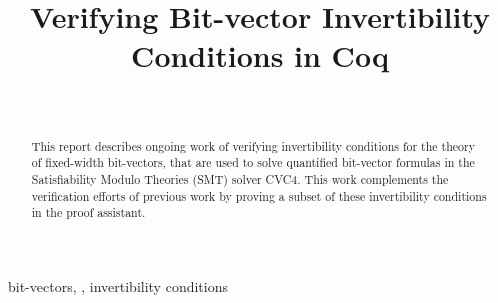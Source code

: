\documentclass[10pt,conference]{IEEEtran}
\begin{document}
\title{Verifying Bit-vector Invertibility Conditions in Coq}


\author{
\\
}

\maketitle



\begin{abstract}
This report describes ongoing work of verifying invertibility 
conditions for the theory of fixed-width bit-vectors, 
that are used 
to solve quantified bit-vector formulas in the 
Satisfiability Modulo Theories (SMT) solver CVC4. 
This work complements the verification 
efforts of previous work by proving a subset of these
invertibility conditions in the \coq proof assistant. 

\end{abstract}

\begin{IEEEkeywords}
bit-vectors, \coq, invertibility conditions
\end{IEEEkeywords}
\end{document}
